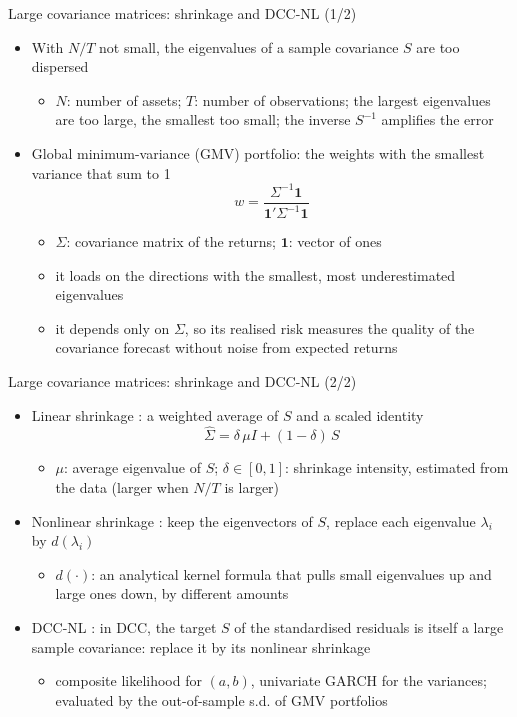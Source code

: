 \begin{frame}{Large covariance matrices: shrinkage and DCC-NL (1/2)}
\itemsize{\small}
\begin{itemize}
    \item With $N/T$ not small, the eigenvalues of a sample covariance $S$ are too dispersed
    \begin{itemize}
        \item $N$: number of assets; $T$: number of observations; the largest eigenvalues are too large, the smallest too small; the inverse $S^{-1}$ amplifies the error
    \end{itemize}
    \item Global minimum-variance (GMV) portfolio: the weights with the smallest variance that sum to 1
    \[ w = \frac{\Sigma^{-1}\mathbf 1}{\mathbf 1'\Sigma^{-1}\mathbf 1} \]
    \begin{itemize}
        \item $\Sigma$: covariance matrix of the returns; $\mathbf 1$: vector of ones
        \item it loads on the directions with the smallest, most underestimated eigenvalues
        \item it depends only on $\Sigma$, so its realised risk measures the quality of the covariance forecast without noise from expected returns
    \end{itemize}
\end{itemize}
\end{frame}

\begin{frame}{Large covariance matrices: shrinkage and DCC-NL (2/2)}
\itemsize{\small}
\begin{itemize}
    \item Linear shrinkage : a weighted average of $S$ and a scaled identity
    \[ \hat\Sigma = \delta\,\mu I + (1 - \delta)\,S \]
    \begin{itemize}
        \item $\mu$: average eigenvalue of $S$; $\delta \in [0, 1]$: shrinkage intensity, estimated from the data (larger when $N/T$ is larger)
    \end{itemize}
    \item Nonlinear shrinkage : keep the eigenvectors of $S$, replace each eigenvalue $\lambda_i$ by $d(\lambda_i)$
    \begin{itemize}
        \item $d(\cdot)$: an analytical kernel formula that pulls small eigenvalues up and large ones down, by different amounts
    \end{itemize}
    \item DCC-NL : in DCC, the target $S$ of the standardised residuals is itself a large sample covariance: replace it by its nonlinear shrinkage
    \begin{itemize}
        \item composite likelihood for $(a, b)$, univariate GARCH for the variances; evaluated by the out-of-sample s.d. of GMV portfolios
    \end{itemize}
\end{itemize}
\end{frame}

